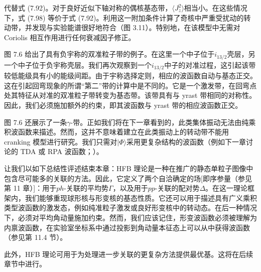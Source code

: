 代替式 (7.92)。对于良好近似下轴对称的偶核基态带，$\langle J^{2}_{z}\rangle$相当小。在这些情况下，式
(7.98) 等价于式 (7.92)。利用这一附加条件计算了奇核中严重受扰动的转动带\cite{RMB74,FDB77}，并发现与实验能谱很好地符合（图
3.11）。特别地，在该模型中无需对 Coriolis 相互作用进行任何衰减因子修正\cite{RM74,Ri77}。

图 7.6 给出了具有负宇称的双准粒子带的例子。在这里一个中子位于$i_{13/2}$壳层，另一个中子位于负宇称壳层。我们再次观察到一个$i_{13/2}$中子的对准过程，这引起该带较低能级具有小的能级间距。由于宇称选择定则，相应的波函数自动与基态正交。这在引起回弯现象的所谓“第二”带的计算中是不同的。它是一个激发带，在回弯点处其特征从对准的双准粒子带转变为基态带。该带具有与
yrast 带相同的对称性。因此，我们必须施加额外的约束，即其波函数与 yrast 带的相应波函数正交\cite{EMR80a}。

图 7.6 还展示了一条$\gamma$-带。正如我们将在下一章看到的，此类集体振动无法由纯乘积波函数来描述。然而，这并不意味着建立在此类振动上的转动带不能用
cranking 模型进行研究。我们只需对$|\Phi\rangle$采用更复杂结构的波函数（例如下一章讨论的 TDA 或 RPA
波函数；\cite{Ho68,CMR75,Ma77a,ERM78,ERM80b}）。

让我们以如下总结性评述结束本章：HFB 理论是一种在推广的静态单粒子图像中包含尽可能多的关联的方法。因此，它定义了两个自洽确定的场{[}即序参量（参见第
11 章）{]}：用于$ph$-关联的平均势$\Gamma$，以及用于$pp$-关联的配对势$\Delta$。在这一理论框架内，我们能够重现球形核与形变核的基态性质。它还可以用于描述具有广义乘积类型波函数的激发态，例如纯准粒子激发或良好形变核中的转动态。在后一种情况下，必须对平均角动量施加约束。然而，我们应该记住，形变波函数必须被理解为内禀波函数，在实验室坐标系中通过投影到角动量本征态上可以从中获得波函数（参见第
11.4 节）。

此外，HFB 理论可用于为处理进一步关联的更复杂方法提供最优基。这将在后续章节中进行。
